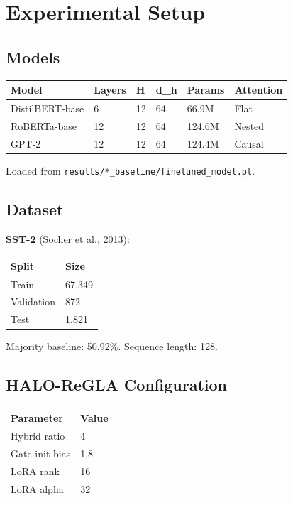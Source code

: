 
\section{Experimental Setup}

\subsection{Models}

\begin{table}[H]
\centering
\small
\begin{tabular}{llllll}
\toprule
\textbf{Model} & \textbf{Layers} & \textbf{H} & \textbf{d\_h} & \textbf{Params} & \textbf{Attention} \\
\midrule
DistilBERT-base & 6 & 12 & 64 & 66.9M & Flat \\
RoBERTa-base & 12 & 12 & 64 & 124.6M & Nested \\
GPT-2 & 12 & 12 & 64 & 124.4M & Causal \\
\bottomrule
\end{tabular}
\end{table}

Loaded from \texttt{results/*\_baseline/finetuned\_model.pt}.

\subsection{Dataset}

\textbf{SST-2} (Socher et al., 2013):

\begin{table}[H]
\centering
\small
\begin{tabular}{ll}
\toprule
\textbf{Split} & \textbf{Size} \\
\midrule
Train & 67,349 \\
Validation & 872 \\
Test & 1,821 \\
\bottomrule
\end{tabular}
\end{table}

Majority baseline: 50.92\%. Sequence length: 128.

\subsection{HALO-ReGLA Configuration}

\begin{table}[H]
\centering
\small
\begin{tabular}{ll}
\toprule
\textbf{Parameter} & \textbf{Value} \\
\midrule
Hybrid ratio & 4 \\
Gate init bias & 1.8 \\
LoRA rank & 16 \\
LoRA alpha & 32 \\
\bottomrule
\end{tabular}
\end{table}

